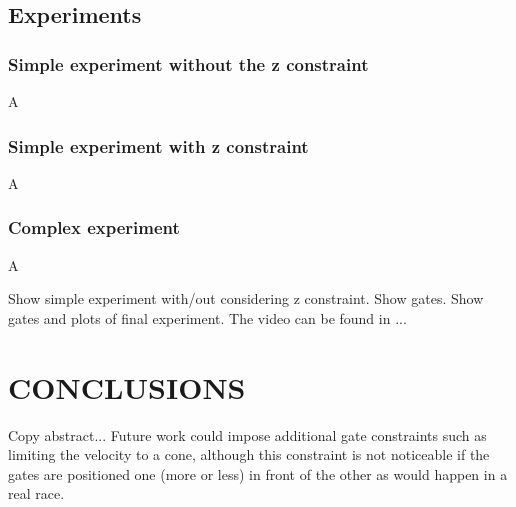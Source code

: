 \documentclass[letterpaper, 10 pt, conference]{ieeeconf}  %
\begin{document}
\subsection{Experiments}

\subsubsection{Simple experiment without the z constraint}
A

\subsubsection{Simple experiment with z constraint}

A

\subsubsection{Complex experiment}

A

Show simple experiment with/out considering z constraint. Show gates.
Show gates and plots of final experiment.
The video can be found in ...

\section{CONCLUSIONS}\label{s:conclusions}

Copy abstract... Future work could impose additional gate constraints such as limiting the velocity to a cone, although this constraint is not noticeable if the gates are positioned one (more or less) in front of the other as would happen in a real race.

\addtolength{\textheight}{-12cm}   %


\balance

\makeatletter
\def\endthebibliography{%
	\def\@noitemerr{\@latex@warning{Empty `thebibliography' environment}}%
	\endlist
}
\makeatother



\end{document}
